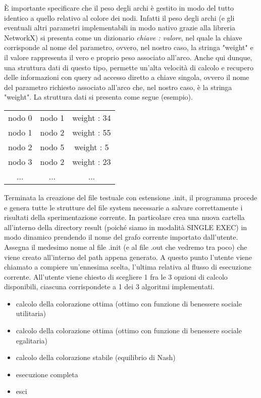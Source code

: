 È importante specificare che il peso degli archi è gestito in modo del tutto identico a quello relativo al colore dei nodi. Infatti il peso degli archi (e gli eventuali altri parametri implementabili in modo nativo grazie alla libreria NetworkX) si presenta come un dizionario \textit{chiave : valore}, nel quale la chiave corrisponde al nome del parametro, ovvero, nel nostro caso, la stringa "weight" e il valore rappresenta il vero e proprio peso associato all'arco. Anche qui dunque, una struttura dati di questo tipo, permette un'alta velocità di calcolo e recupero delle informazioni con query ad accesso diretto a chiave singola, ovvero il nome del parametro richiesto associato all'arco che, nel nostro caso, è la stringa "weight". La struttura dati si presenta come segue (esempio).

\begin{table}[H]
\centering
\begin{tabular}{ccc}
nodo 0 & nodo 1 & weight : 34 \\
nodo 1 & nodo 2 & weight : 55 \\
nodo 2 & nodo 5 & weight : 5 \\
nodo 3 & nodo 2 & weight : 23 \\
... & ... & ...
\end{tabular}
\end{table}

Terminata la creazione del file testuale con estensione .init, il programma procede e genera tutte le strutture del file system necessarie a salvare correttamente i risultati della sperimentazione corrente. In particolare crea una nuova cartella all'interno della directory result (poiché siamo in modalità SINGLE EXEC) in modo dinamico prendendo il nome del grafo corrente importato dall'utente. Assegna il medesimo nome al file .init (e al file .out che vedremo tra poco) che viene creato all'interno del path appena generato. A questo punto l'utente viene chiamato a compiere un'ennesima scelta, l'ultima relativa al flusso di esecuzione corrente. All'utente viene chiesto di scegliere 1 fra le 3 opzioni di calcolo disponibili, ciascuna corrispondete a 1 dei 3 algoritmi implementati.

\begin{itemize}
	\item calcolo della colorazione ottima (ottimo con funzione di benessere sociale utilitaria)
	\item calcolo della colorazione ottima (ottimo con funzione di benessere sociale egalitaria)
	\item calcolo della colorazione stabile (equilibrio di Nash)
	\item esecuzione completa
	\item esci
\end{itemize}

